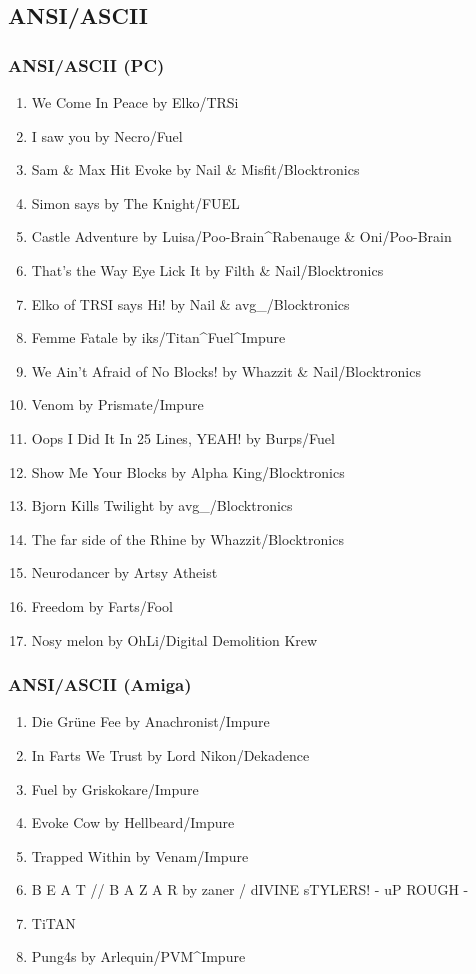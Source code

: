 \documentclass{beamer}
\begin{document}
\subsection{ANSI/ASCII}
\begin{frame}
  \frametitle{ANSI/ASCII (PC)}
  {\tiny\begin{enumerate}
  \item We Come In Peace by Elko/TRSi
  \item I saw you by Necro/Fuel
  \item Sam \& Max Hit Evoke by Nail \& Misfit/Blocktronics 
  \item Simon says by The Knight/FUEL
  \item Castle Adventure by Luisa/Poo-Brain\^{}Rabenauge \& Oni/Poo-Brain
  \item That's the Way Eye Lick It by Filth \& Nail/Blocktronics 
  \item Elko of TRSI says Hi! by Nail \& avg\_/Blocktronics 
  \item Femme Fatale by iks/Titan\^{}Fuel\^{}Impure
  \item We Ain't Afraid of No Blocks!  by Whazzit \& Nail/Blocktronics
  \item Venom by Prismate/Impure 
  \item Oops I Did It In 25 Lines, YEAH! by Burps/Fuel 
  \item Show Me Your Blocks by Alpha King/Blocktronics 
  \item Bjorn Kills Twilight by avg\_/Blocktronics 
  \item The far side of the Rhine by Whazzit/Blocktronics 
  \item Neurodancer by Artsy Atheist 
  \item Freedom by Farts/Fool 
  \item Nosy melon by OhLi/Digital Demolition Krew
  \end{enumerate}}
\end{frame}

\begin{frame}
  \frametitle{ANSI/ASCII (Amiga)}
  \begin{enumerate}
  \item Die Grüne Fee by Anachronist/Impure 
  \item In Farts We Trust by Lord Nikon/Dekadence 
  \item Fuel by Griskokare/Impure 
  \item Evoke Cow by Hellbeard/Impure 
  \item Trapped Within by Venam/Impure 
  \item B E A T // B A Z A R by zaner / dIVINE sTYLERS! - uP ROUGH -
  \item TiTAN
  \item Pung4s by Arlequin/PVM\^{}Impure 
  \end{enumerate}
\end{frame}
\end{document}
